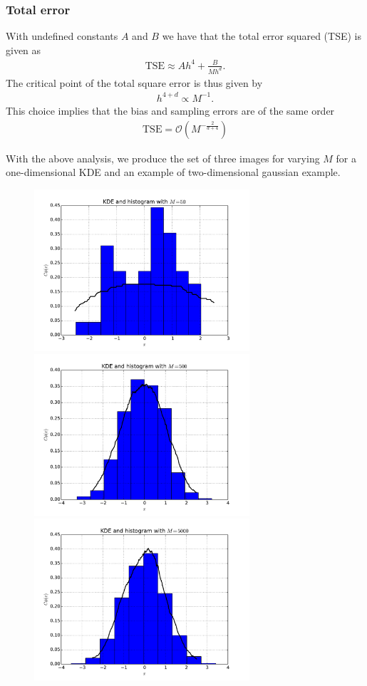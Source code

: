 \documentclass[a4paper,11pt]{article}
\newcommand{\parent}[1]{\left( {#1} \right)}
\newcommand{\bigo}[1]{\mathcal O \parent{{#1}}}
\begin{document}
\subsubsection*{Total error}
With undefined constants $A$ and $B$ we have that the 
total error squared (TSE) is given as
\begin{align}
\mathrm{TSE} \approx A h^4 + \frac{B}{Mh^d}.
\end{align}
The critical point of the total square error
is thus given by
\begin{align}
h^{4+d} \propto M^{-1}.
\end{align}
This choice implies that the bias and sampling errors are of the same order
\begin{align}
\mathrm{TSE} = \bigo{M^{-\frac{2}{d+4}}}
\end{align}

With the above analysis, we produce the set of three images
for varying $M$ for a one-dimensional KDE and an example of
two-dimensional gaussian example.
\begin{figure}
\begin{center}
\includegraphics[width=80mm]{./kde_histogram_M_50.pdf}
\includegraphics[width=80mm]{./kde_histogram_M_500.pdf}
\includegraphics[width=80mm]{./kde_histogram_M_5000.pdf}
\end{center}
\end{figure}
\end{document}
